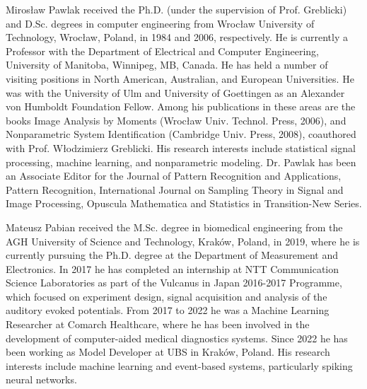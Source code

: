 \documentclass[lettersize,journal,onecolumn]{IEEEtran}
\theoremstyle{definition}
\begin{document}
\begin{IEEEbiography}
	{Mirosław Pawlak} received
	the Ph.D. (under the supervision of Prof. Greblicki) and D.Sc. degrees in computer engineering from Wrocław University of Technology,
	Wrocław, Poland, in 1984 and 2006, respectively.
	He is currently a Professor with the Department of Electrical and Computer Engineering,
	University of Manitoba, Winnipeg, MB, Canada.
	He has held a number of visiting positions in
	North American, Australian, and European Universities. He was with the University of Ulm and University of Goettingen
	as an Alexander von Humboldt Foundation Fellow. Among his publications in these areas are the books Image Analysis by Moments (Wrocław
	Univ. Technol. Press, 2006), and Nonparametric System Identification
	(Cambridge Univ. Press, 2008), coauthored with Prof. Włodzimierz Greblicki. His research interests include statistical signal processing, machine learning, and nonparametric modeling.
	Dr. Pawlak has been an Associate Editor for the Journal of Pattern
	Recognition and Applications, Pattern Recognition, International Journal
	on Sampling Theory in Signal and Image Processing, Opuscula Mathematica and Statistics in Transition-New Series.
\end{IEEEbiography}

\begin{IEEEbiography}
	{Mateusz Pabian} received the M.Sc.
	degree in biomedical engineering from the AGH
	University of Science and Technology, Kraków,
	Poland, in 2019, where he is currently pursuing the
	Ph.D. degree at the Department of Measurement and Electronics.
	In 2017 he has completed an internship at NTT Communication Science Laboratories as
	part of the Vulcanus in Japan 2016-2017 Programme, which focused on experiment 
	design, signal acquisition and analysis of the auditory evoked potentials.
	From 2017 to 2022 he was a Machine Learning Researcher at Comarch Healthcare, where
	he has been involved in the development of computer-aided medical diagnostics
	systems.
	Since 2022 he has been working as Model Developer at UBS in Kraków, Poland.
	His research
	interests include machine learning and event-based systems, particularly
	spiking neural networks.
\end{IEEEbiography}
\end{document}
